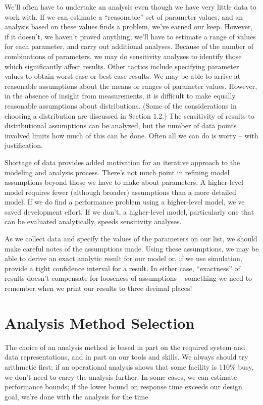 We'll often have to undertake an analysis even though we have very little data
 to work with. If we can estimate a ``reasonable'' set of parameter values, and
an analysis based on these values finds a problem, we've earned our keep.
However, if it doesn't, we haven't proved anything; we'll have to estimate a
range of values for each parameter, and carry out additional analyses. Because
of the number of combinations of parameters, we may do sensitivity analyses
 to identify those which significantly affect results. Other tactics include
specifying parameter values to obtain worst-case or best-case results. We may
be able to arrive at reasonable assumptions about the means or ranges of
parameter values. However, in the absence of insight from measurements, it is
difficult to make equally reasonable assumptions about distributions. (Some
of the considerations in choosing a distribution are discussed in Section
1.2.) The sensitivity of results to distributional assumptions can be
analyzed, but the number of data points involved limits how much of this can
be done. Often all we can do is worry -- with justification.

Shortage of data provides added motivation for an iterative approach to the
modeling and analysis process. There's not much point in refining model
assumptions beyond those we have to make about parameters. A higher-level
model requires fewer (although broader) assumptions than a more detailed
model. If we do find a performance problem using a higher-level model, we've
saved development effort. If we don't, a higher-level model, particularly one
that can be evaluated analytically, speeds sensitivity analyses.

As we collect data and specify the values of the parameters on our list, we
should make careful notes of the assumptions made. Using these assumptions,
we may be able to derive an exact analytic result for our model or, if we use
simulation, provide a tight confidence interval for a result. In either case,
``exactness'' of results doesn't compensate for looseness of assumptions --
something we need to remember when we print our results to three decimal
places!

\section{Analysis Method Selection}
\label{sec:analysis-method-selection}

The choice of an analysis method is based in part on the required system and
data representations, and in part on our tools and skills. We always should
try arithmetic first; if an operational analysis shows that some facility is
110\% busy, we don't need to carry the analysis further. In some cases, we can
estimate performance bounds; if the lower bound on response time exceeds our
design goal, we're done with the analysis for the time

